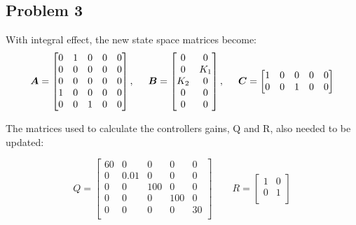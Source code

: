 \subsection{Problem 3}
With integral effect, the new state space matrices become:
\begin{equation}
  \boldsymbol{A} = \begin{bmatrix}
    0 & 1 & 0 & 0 & 0\\
    0 & 0 & 0 & 0 & 0\\
    0 & 0 & 0 & 0 & 0\\
    1 & 0 & 0 & 0 & 0\\
    0 & 0 & 1 & 0 & 0\\
  \end{bmatrix}, \hspace{0.5cm}
  \boldsymbol{B} = \begin{bmatrix}
    0 & 0 \\
    0 & K_1 \\
    K_2 & 0 \\
    0 & 0 \\
    0 & 0 \\
  \end{bmatrix}, \hspace{0.5cm}
  \boldsymbol{C} = \begin{bmatrix}
    1 & 0 & 0 & 0 & 0\\
    0 & 0 & 1 & 0 & 0\\
  \end{bmatrix}
\end{equation}

The matrices used to calculate the controllers gains, Q and R, also
needed to be updated:

\begin{equation}
  Q =
  \begin{bmatrix}
    60 & 0   & 0  & 0 & 0 \\
    0  & 0.01 & 0  & 0 & 0 \\
    0  & 0   & 100 & 0 & 0 \\
    0  & 0   & 0  & 100 & 0 \\
    0  & 0   & 0  & 0 & 30 \\
  \end{bmatrix}
  \qquad
  R =
  \begin{bmatrix}
    1 & 0 \\
    0 & 1 \\
  \end{bmatrix}
\end{equation}

